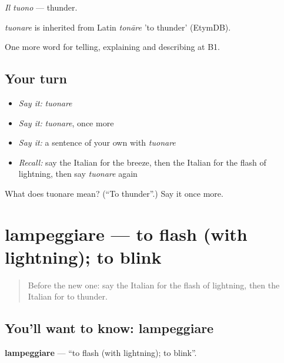 \emph{Il tuono} — thunder.

\begin{cousinweb}
\emph{tuonare} is inherited from Latin \emph{tonāre} 'to thunder' (EtymDB).
\end{cousinweb}

\begin{grammarlens}[title={What you've built}]
One more word for telling, explaining and describing at B1.
\end{grammarlens}

\subsection*{Your turn}
\begin{itemize}
\raggedright
  \item \emph{Say it:} \emph{tuonare}
  \item \emph{Say it:} \emph{tuonare}, once more
  \item \emph{Say it:} a sentence of your own with \emph{tuonare}
  \item \emph{Recall:} say the Italian for the breeze, then the Italian for the flash of lightning, then say \emph{tuonare} again
\end{itemize}

\begin{tcolorbox}[breakable,colback=teal!4,colframe=teal!35!black,title={Before you move on}]
What does tuonare mean? (\textquotedblleft{}To thunder\textquotedblright{}.) Say it once more.
\end{tcolorbox}
\section[lampeggiare]{lampeggiare — to flash (with lightning); to blink}

\label{lesson:IT-C467-lampeggiare}



\begin{quote}
Before the new one: say the Italian for the flash of lightning, then the Italian for to thunder.
\end{quote}

\subsection*{You'll want to know: lampeggiare}
\textbf{lampeggiare} — \textquotedblleft{}to flash (with lightning); to blink\textquotedblright{}.


